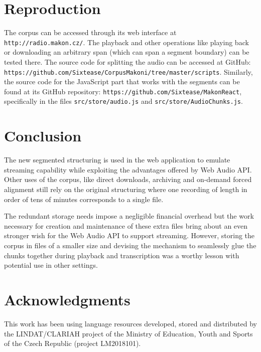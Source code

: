 \documentclass[runningheads]{llncs}
\begin{document}
\section{Reproduction}

The corpus can be accessed through its web interface at
\texttt{http://radio.makon.cz/}. The playback and other operations like playing
back or downloading an arbitrary span (which can span a segment boundary) can be
tested there. The source code for splitting the audio can be accessed at
GitHub: \\
\texttt{https://github.com/Sixtease/CorpusMakoni/tree/master/scripts}.
Similarly, the source code for the JavaScript part that works with the segments
can be found at its GitHub repository:
\texttt{https://github.com/Sixtease/MakonReact}, specifically in the files
\texttt{src/store/audio.js} and \texttt{src/store/AudioChunks.js}.

\section{Conclusion}

The new segmented structuring is used in the web application to emulate streaming capability while exploiting the advantages offered by Web Audio API. Other uses of the corpus, like direct downloads, archiving and on-demand forced alignment still rely on the original structuring where one recording of length in order of tens of minutes corresponds to a single file.

The redundant storage needs impose a negligible financial overhead but the work necessary for creation and maintenance of these extra files bring about an even stronger wish for the Web Audio API to support streaming. However, storing the corpus in files of a smaller size and devising the mechanism to seamlessly glue the chunks together during playback and transcription was a worthy lesson with potential use in other settings.


\section*{Acknowledgments}

This work has been using language resources developed, stored and distributed by
the LINDAT/CLARIAH project of the Ministry of Education, Youth and Sports of the
Czech Republic (project LM2018101).




\end{document}
